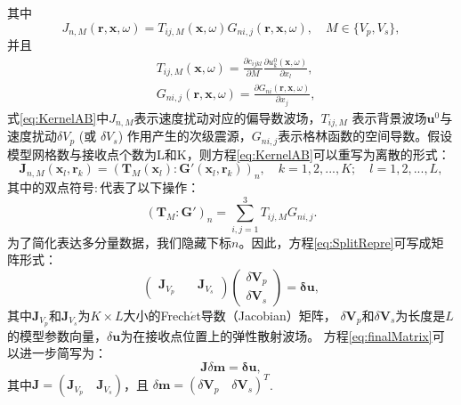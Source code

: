 其中
\begin{equation}
        J_{n,M}(\mathbf{r,x},\omega)=
        T_{ij,M}(\mathbf{x},\omega)G_{ni,j}(\mathbf{r,x},\omega), \quad M\in\{V_p,V_s\},
\label{eq:KernelAB}
\end{equation}
并且
\begin{equation}
\begin{split}
                &T_{ij,M}(\mathbf{x},\omega)=\frac{\partial c_{ijkl}}{\partial M}\frac{\partial
                        u^0_{k}(\mathbf{x},\omega)}{\partial x_l},\\ 
                        &G_{ni,j}(\mathbf{r,x},\omega)=\frac{\partial
                                G_{ni}(\mathbf{r},\mathbf{x},\omega)}{\partial x_j},
\end{split}
\label{eq:traction}
\end{equation}
式\eqref{eq:KernelAB}中$J_{n,M}$表示速度扰动对应的偏导数波场\cite[]{pratt1998gauss}，$T_{ij,M}$
表示背景波场$\mathbf{u}^0$与速度扰动$\delta V_p$ (或 $\delta V_s$)
作用产生的次级震源，$G_{ni,j}$表示格林函数的空间导数。假设模型网格数与接收点个数为L和K，则方程\eqref{eq:KernelAB}可以重写为离散的形式：
\begin{equation}
        \mathbf{J}_{n,M}(\mathbf{x}_l,\mathbf{r}_k)=
        (\mathbf{T}_M(\mathbf{x}_l):\mathbf{G}'(\mathbf{x}_l,\mathbf{r}_k))_n,\quad
        k=1,2,...,K;\quad l=1, 2,...,L,
        \label{eq:EquivFre}
\end{equation}
其中的双点符号$:$代表了以下操作：
\begin{equation}
    (\mathbf{T}_M:\mathbf{G}')_{n}=\sum_{i,j=1}^{3}T_{ij,M}G_{ni,j}.
    \label{eq:contraction}
\end{equation}
为了简化表达多分量数据，我们隐藏下标$n$。因此，方程\eqref{eq:SplitRepre}可写成矩阵形式：
\begin{equation}
            \begin{pmatrix}
                        \mathbf{J}_{V_p}&\quad\mathbf{J}_{V_s}
    \end{pmatrix}
    \begin{pmatrix}
       \delta  \mathbf{V}_p\\
       \delta \mathbf{V}_s
    \end{pmatrix}
    =
        \mathbf{\delta u},
        \label{eq:finalMatrix}
\end{equation}
其中$\mathbf{J}_{V_p}$和$\mathbf{J}_{V_s}$为$K\times L$大小的Frech{$\acute{e}$}t导数（Jacobian）矩阵，
$\delta \mathbf{V}_p$和$\delta \mathbf{V}_s$为长度是$L$的模型参数向量，$\delta \mathbf{u}$为在接收点位置上的弹性散射波场。
方程\eqref{eq:finalMatrix}可以进一步简写为：
\begin{equation}
        \mathbf{J}\delta \mathbf{m}
    =
        \mathbf{\delta u},
        \label{eq:finalMatrixshort}
\end{equation}
其中$\mathbf{J}=(\mathbf{J}_{V_p}\quad\mathbf{J}_{V_s})$，且 
$\delta \mathbf{m}=(\delta\mathbf{V}_p \quad \delta\mathbf{V}_s)^T$.

